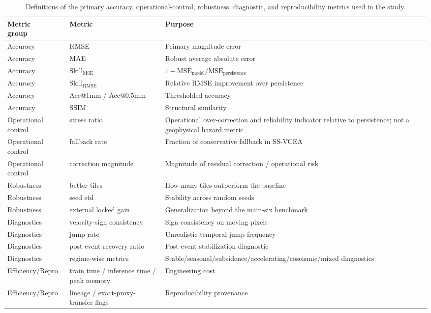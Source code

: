 \documentclass[lettersize,journal]{IEEEtran}
\begin{document}
\begin{table}[!t]
  \centering
  \caption{Definitions of the primary accuracy, operational-control, robustness, diagnostic, and reproducibility metrics used in the study.}
  \label{tab:table03}
  \footnotesize
  \begin{adjustbox}{max width=\textwidth}
  \begin{tabular}{p{}p{}p{}}
    \toprule
    \shortstack{Metric\\group} & Metric & Purpose \\
    \midrule
    Accuracy & RMSE & Primary magnitude error \\
    Accuracy & MAE & Robust average absolute error \\
    Accuracy & Skill$_{\mathrm{MSE}}$ & $1 - \mathrm{MSE}_{\mathrm{model}} / \mathrm{MSE}_{\mathrm{persistence}}$ \\
    Accuracy & Skill$_{\mathrm{RMSE}}$ & Relative RMSE improvement over persistence \\
    Accuracy & Acc@1mm / Acc@0.5mm & Thresholded accuracy \\
    Accuracy & SSIM & Structural similarity \\
    Operational control & stress ratio & Operational over-correction and reliability indicator relative to persistence; not a geophysical hazard metric \\
    Operational control & fallback rate & Fraction of conservative fallback in SS-VCEA \\
    Operational control & correction magnitude & Magnitude of residual correction / operational risk \\
    Robustness & better tiles & How many tiles outperform the baseline \\
    Robustness & seed std & Stability across random seeds \\
    Robustness & external locked gain & Generalization beyond the main-six benchmark \\
    Diagnostics & velocity-sign consistency & Sign consistency on moving pixels \\
    Diagnostics & jump rate & Unrealistic temporal jump frequency \\
    Diagnostics & post-event recovery ratio & Post-event stabilization diagnostic \\
    Diagnostics & regime-wise metrics & Stable/seasonal/subsidence/accelerating/coseismic/mixed diagnostics \\
    Efficiency/Repro & train time / inference time / peak memory & Engineering cost \\
    Efficiency/Repro & lineage / exact-proxy-transfer flags & Reproducibility provenance \\
    \bottomrule
  \end{tabular}
  \end{adjustbox}
\end{table}
\end{document}
